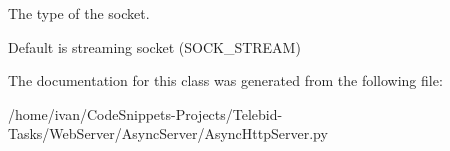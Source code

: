 The type of the socket. 

Default is streaming socket (S\-O\-C\-K\-\_\-\-S\-T\-R\-E\-A\-M) 

The documentation for this class was generated from the following file\-:\begin{DoxyCompactItemize}
\item 
/home/ivan/\-Code\-Snippets-\/\-Projects/\-Telebid-\/\-Tasks/\-Web\-Server/\-Async\-Server/Async\-Http\-Server.\-py\end{DoxyCompactItemize}
